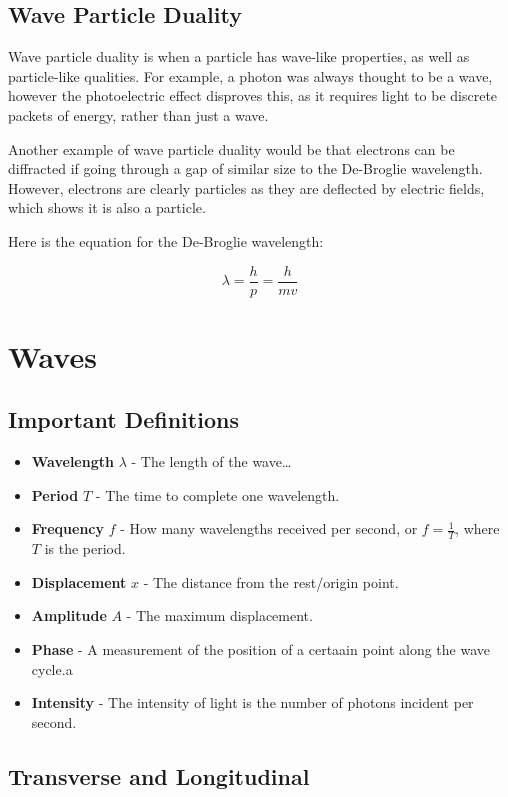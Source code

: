 \documentclass[a4paper, 12pt]{article}
\begin{document}
\subsection{Wave Particle Duality}

Wave particle duality is when a particle has wave-like properties, as well as particle-like qualities. For example, a photon was always thought to be a wave, however the photoelectric effect disproves this, as it requires light to be discrete packets of energy, rather than just a wave.

Another example of wave particle duality would be that electrons can be diffracted if going through a gap of similar size to the De-Broglie wavelength. However, electrons are clearly particles as they are deflected by electric fields, which shows it is also a particle.

Here is the equation for the De-Broglie wavelength:

$$
\lambda = \frac{h}{p} = \frac{h}{mv}
$$

\newpage
\section{Waves}

\subsection{Important Definitions}

\begin{itemize}
	\item{\textbf{Wavelength} $\lambda$ - The length of the wave\dots}
	\item{\textbf{Period} $T$ - The time to complete one wavelength.}
	\item{\textbf{Frequency} $f$ - How many wavelengths received per second, or {$f = \frac{1}{T}$}, where $T$ is the period.}
	\item{\textbf{Displacement} $x$ - The distance from the rest/origin point.}
	\item{\textbf{Amplitude} $A$ - The maximum displacement.}
	\item{\textbf{Phase} - A measurement of the position of a certaain point along the wave cycle.}a
	\item{\textbf{Intensity} - The intensity of light is the number of photons incident per second.}
\end{itemize}

\subsection{Transverse and Longitudinal}
\end{document}
